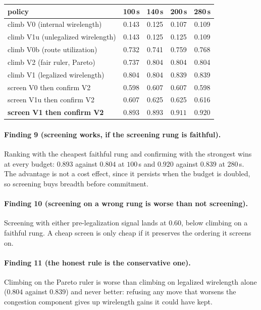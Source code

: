 \documentclass{article}
\begin{document}
\begin{center}
\begin{tabular}{lcccc}
\toprule
policy & 100\,s & 140\,s & 200\,s & 280\,s \\
\midrule
climb V0 (internal wirelength) & 0.143 & 0.125 & 0.107 & 0.109 \\
climb V1u (unlegalized wirelength) & 0.143 & 0.125 & 0.125 & 0.109 \\
climb V0b (route utilization) & 0.732 & 0.741 & 0.759 & 0.768 \\
climb V2 (fair ruler, Pareto) & 0.737 & 0.804 & 0.804 & 0.804 \\
climb V1 (legalized wirelength) & 0.804 & 0.804 & 0.839 & 0.839 \\
screen V0 then confirm V2 & 0.598 & 0.607 & 0.607 & 0.598 \\
screen V1u then confirm V2 & 0.607 & 0.625 & 0.625 & 0.616 \\
\textbf{screen V1 then confirm V2} & $\mathbf{0.893}$ & $\mathbf{0.893}$ & $\mathbf{0.911}$ & $\mathbf{0.920}$ \\
\bottomrule
\end{tabular}
\end{center}

\paragraph{Finding 9 (screening works, if the screening rung is faithful).} Ranking
with the cheapest faithful rung and confirming with the strongest wins at every
budget: $0.893$ against $0.804$ at $100\,$s and $0.920$ against $0.839$ at $280\,$s.
The advantage is not a cost effect, since it persists when the budget is doubled, so
screening buys breadth before commitment.

\paragraph{Finding 10 (screening on a wrong rung is worse than not screening).}
Screening with either pre-legalization signal lands at $0.60$, below climbing on a
faithful rung. A cheap screen is only cheap if it preserves the ordering it screens
on.

\paragraph{Finding 11 (the honest rule is the conservative one).} Climbing on the
Pareto ruler is worse than climbing on legalized wirelength alone ($0.804$ against
$0.839$) and never better: refusing any move that worsens the congestion component
gives up wirelength gains it could have kept.
\end{document}
